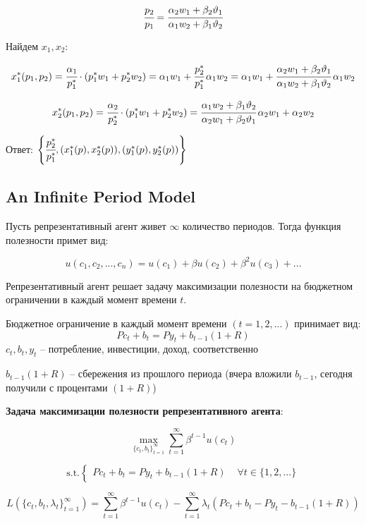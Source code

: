 \documentclass[reqno]{article}
\theoremstyle{definition}
\theoremstyle{definition}
\theoremstyle{definition}
\theoremstyle{definition}
\theoremstyle{definition}
\theoremstyle{definition}
\theoremstyle{definition}
\theoremstyle{definition}
\theoremstyle{definition}
\begin{document}
			$$\cfrac{p_2}{p_1} = \cfrac{\alpha_2 w_1 + \beta_2 \vartheta_1}{\alpha_1 w_2 + \beta_1 \vartheta_2}$$
			
			Найдем $x_1, x_2$:
			
			$$x_1^*(p_1, p_2) = \cfrac{\alpha_1}{p_1^*} \cdot (p_1^* w_1+p_2^* w_2) = \alpha_1 w_1 + \cfrac{p_2^*}{p_1^*} \, \alpha_1 w_2 = \alpha_1 w_1 + \cfrac{\alpha_2 w_1 + \beta_2 \vartheta_1}{\alpha_1 w_2 + \beta_1 \vartheta_2} \, \alpha_1 w_2$$
			
			$$x_2^*(p_1, p_2) = \cfrac{\alpha_2}{p_2^*} \cdot (p_1^* w_1+p_2^* w_2) =  \cfrac{\alpha_1 w_2 + \beta_1 \vartheta_2}{\alpha_2 w_1 + \beta_2 \vartheta_1}  \, \alpha_2 w_1 + \alpha_2 w_2$$
			
			Ответ: $\left\{\cfrac{p_2^*}{p_1^*},(x_1^*(p), x_2^*(p)),(y_1^*(p), y_2^*(p))\right\}$
		
			\subsection{An Infinite Period Model}
			
			Пусть репрезентативный агент живет $\infty$ количество периодов. Тогда функция полезности примет вид:
			
			$$u(c_1,c_2,...,c_n)=u(c_1)+\beta u(c_2) + \beta^2 u(c_3) + ...$$
			
			Репрезентативный агент решает задачу максимизации полезности на бюджетном ограничении в каждый момент времени $t$. 
			
			Бюджетное ограничение в каждый момент времени $(t=1,2,...)$ принимает вид: 
			$$P c_t + b_t = P y_t + b_{t-1}(1+R)$$
			$c_t, b_t, y_t$ -- потребление, инвестиции, доход, соответственно
			
			$b_{t-1}(1+R)$ -- сбережения из прошлого периода (вчера вложили $b_{t-1}$, сегодня получили с процентами $(1+R)$)
			
			\textbf{Задача максимизации полезности репрезентативного агента}:
			
			$$\max\limits_{\{c_t,b_t\}_{t=1}^\infty} \sum\limits_{t=1}^\infty \beta^{t-1} u(c_t)$$
			
			$$
			\text{s.t.}
			\begin{cases}
				P c_t + b_t = P y_t + b_{t-1} (1+R) \, & \, \forall t \in \{1,2,...\}
			\end{cases}
			$$
			
			$$L(\{c_t, b_t, \lambda_t\}_{t=1}^\infty) = \sum\limits_{t=1}^\infty \beta^{t-1} u(c_t) - \sum\limits_{t=1}^\infty \lambda_t (P c_t + b_t - P y_t - b_{t-1}(1+R))$$
			
\end{document}
